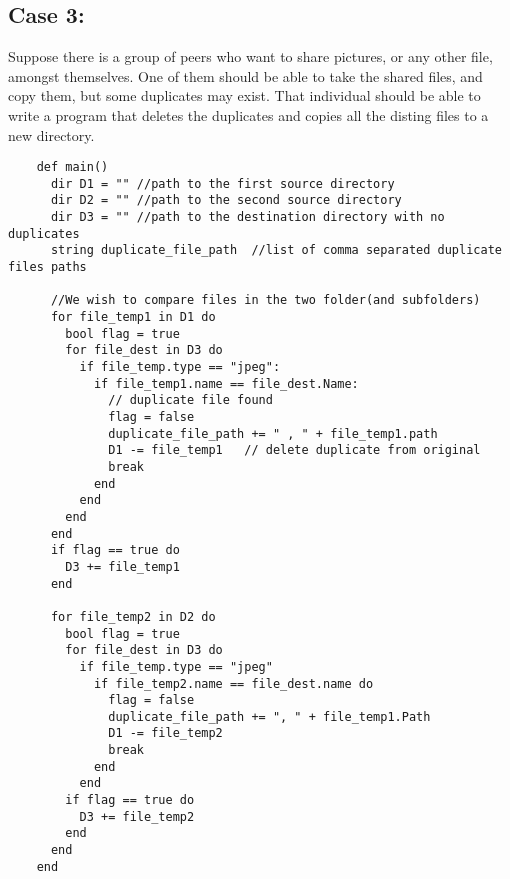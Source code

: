 \documentclass[11pt]{article}
\begin{document}
\newpage
\subsection{Case 3:}
Suppose there is a group of peers who want to share pictures, or any other file, amongst themselves. One of them should be able to take the shared files, and copy them, but some duplicates may exist. That individual should be able to write a program that deletes the duplicates and copies all the disting files to a new directory.
\begin{listing}[H]
  \begin{verbatim}
    def main()
      dir D1 = "" //path to the first source directory
      dir D2 = "" //path to the second source directory
      dir D3 = "" //path to the destination directory with no duplicates
      string duplicate_file_path  //list of comma separated duplicate files paths

      //We wish to compare files in the two folder(and subfolders)
      for file_temp1 in D1 do
        bool flag = true
        for file_dest in D3 do
          if file_temp.type == "jpeg":
            if file_temp1.name == file_dest.Name:
              // duplicate file found
              flag = false
              duplicate_file_path += " , " + file_temp1.path
              D1 -= file_temp1   // delete duplicate from original
              break
            end
          end
        end
      end
      if flag == true do
        D3 += file_temp1
      end

      for file_temp2 in D2 do
        bool flag = true
        for file_dest in D3 do
          if file_temp.type == "jpeg"
            if file_temp2.name == file_dest.name do
              flag = false
              duplicate_file_path += ", " + file_temp1.Path
              D1 -= file_temp2
              break
            end
          end
        if flag == true do
          D3 += file_temp2
        end
      end
    end
  \end{verbatim}
\end{listing}

\newpage
\end{document}
